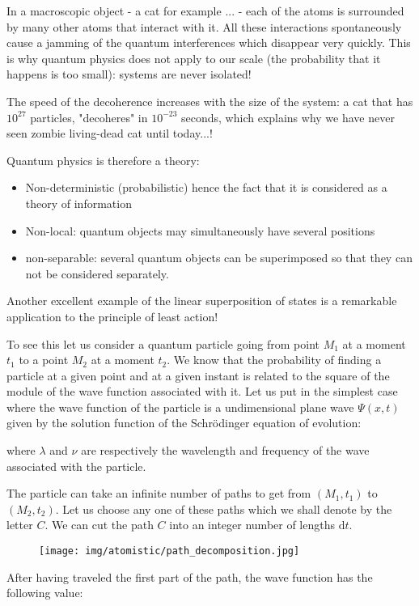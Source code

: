 	In a macroscopic object - a cat for example ... - each of the atoms is surrounded by many other atoms that interact with it. All these interactions spontaneously cause a jamming of the quantum interferences which disappear very quickly. This is why quantum physics does not apply to our scale (the probability that it happens is too small): systems are never isolated!

	The speed of the decoherence increases with the size of the system: a cat that has $10^{27}$ particles, "decoheres" in $10^{-23}$ seconds, which explains why we have never seen zombie living-dead cat until today...!
	
	Quantum physics is therefore a theory:
	\begin{itemize}
		\item Non-deterministic (probabilistic) hence the fact that it is considered as a theory of information

		\item Non-local: quantum objects may simultaneously have several positions

		\item non-separable: several quantum objects can be superimposed so that they can not be considered separately.
	\end{itemize}
	Another excellent example of the linear superposition of states is a remarkable application to the principle of least action!

	To see this let us consider a quantum particle going from point $M_1$ at a moment $t_1$ to a point $M_2$ at a moment $t_2$. We know that the probability of finding a particle at a given point and at a given instant is related to the square of the module of the wave function associated with it. Let us put in the simplest case where the wave function of the particle is a undimensional plane wave $\Psi(x,t)$ given by the solution function of the Schrödinger equation of evolution:
	
	where $\lambda$ and $\nu$ are respectively the wavelength and frequency of the wave associated with the particle.

	The particle can take an infinite number of paths to get from $(M_1,t_1)$ to $(M_2,t_2)$. Let us choose any one of these paths which we shall denote by the letter $C$. We can cut the path $C$ into an integer number of lengths $\mathrm{d}t$.
	\begin{figure}[H]
		\centering
		\texttt{[image: img/atomistic/path\_decomposition.jpg]}	
	\end{figure}
	After having traveled the first part of the path, the wave function has the following value:
	
